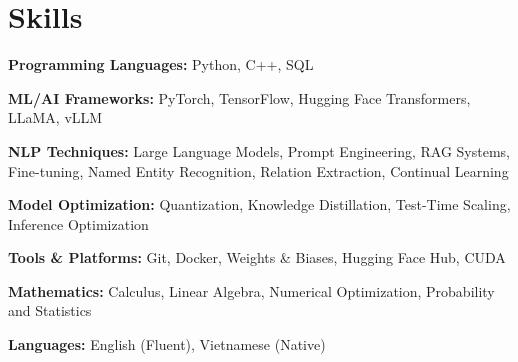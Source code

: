 \section{Skills}
\resumeSubHeadingListStart

    \resumeProjectHeading
    {\textbf{Programming Languages:} {Python, C++, SQL}}

    \resumeProjectHeading
    {\textbf{ML/AI Frameworks:} {PyTorch, TensorFlow, Hugging Face Transformers, LLaMA, vLLM}}

    \resumeProjectHeading
    {\textbf{NLP Techniques:} {Large Language Models, Prompt Engineering, RAG Systems, Fine-tuning, Named Entity Recognition, Relation Extraction, Continual Learning}}

    \resumeProjectHeading
    {\textbf{Model Optimization:} {Quantization, Knowledge Distillation, Test-Time Scaling, Inference Optimization}}

    \resumeProjectHeading
    {\textbf{Tools \& Platforms:} {Git, Docker, Weights \& Biases, Hugging Face Hub, CUDA}}

    \resumeProjectHeading
    {\textbf{Mathematics:} {Calculus, Linear Algebra, Numerical Optimization, Probability and Statistics}}

    \resumeProjectHeading
    {\textbf{Languages:} {English (Fluent), Vietnamese (Native)}}

\resumeSubHeadingListEnd